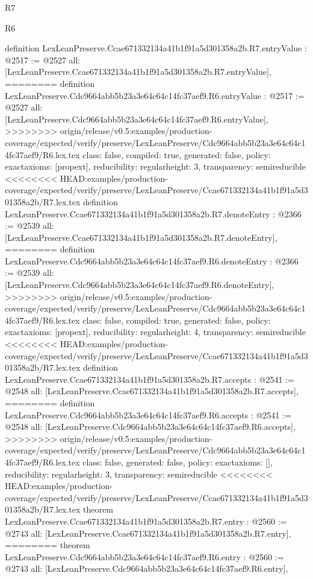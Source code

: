 \begin{lexlean}{R7}
\begin{lexlean}{R6}
\begin{coremodule}
{{{{{{{{{{{{{{definition LexLeanPreserve.Ccae671332134a41b1f91a5d301358a2b.R7.entryValue : @2517 := @2527 {
  all: [LexLeanPreserve.Ccae671332134a41b1f91a5d301358a2b.R7.entryValue],
========
definition LexLeanPreserve.Cdc9664abb5b23a3e64c64c14fc37aef9.R6.entryValue : @2517 := @2527 {
  all: [LexLeanPreserve.Cdc9664abb5b23a3e64c64c14fc37aef9.R6.entryValue],
>>>>>>>> origin/release/v0.5:examples/production-coverage/expected/verify/preserve/LexLeanPreserve/Cdc9664abb5b23a3e64c64c14fc37aef9/R6.lex.tex
  class: false,
  compiled: true,
  generated: false,
  policy: exact{axioms: [propext]},
  reducibility: regular{height: 3},
  transparency: semireducible
}
<<<<<<<< HEAD:examples/production-coverage/expected/verify/preserve/LexLeanPreserve/Ccae671332134a41b1f91a5d301358a2b/R7.lex.tex
definition LexLeanPreserve.Ccae671332134a41b1f91a5d301358a2b.R7.denoteEntry : @2366 := @2539 {
  all: [LexLeanPreserve.Ccae671332134a41b1f91a5d301358a2b.R7.denoteEntry],
========
definition LexLeanPreserve.Cdc9664abb5b23a3e64c64c14fc37aef9.R6.denoteEntry : @2366 := @2539 {
  all: [LexLeanPreserve.Cdc9664abb5b23a3e64c64c14fc37aef9.R6.denoteEntry],
>>>>>>>> origin/release/v0.5:examples/production-coverage/expected/verify/preserve/LexLeanPreserve/Cdc9664abb5b23a3e64c64c14fc37aef9/R6.lex.tex
  class: false,
  compiled: true,
  generated: false,
  policy: exact{axioms: [propext]},
  reducibility: regular{height: 4},
  transparency: semireducible
}
<<<<<<<< HEAD:examples/production-coverage/expected/verify/preserve/LexLeanPreserve/Ccae671332134a41b1f91a5d301358a2b/R7.lex.tex
definition LexLeanPreserve.Ccae671332134a41b1f91a5d301358a2b.R7.accepts : @2541 := @2548 {
  all: [LexLeanPreserve.Ccae671332134a41b1f91a5d301358a2b.R7.accepts],
========
definition LexLeanPreserve.Cdc9664abb5b23a3e64c64c14fc37aef9.R6.accepts : @2541 := @2548 {
  all: [LexLeanPreserve.Cdc9664abb5b23a3e64c64c14fc37aef9.R6.accepts],
>>>>>>>> origin/release/v0.5:examples/production-coverage/expected/verify/preserve/LexLeanPreserve/Cdc9664abb5b23a3e64c64c14fc37aef9/R6.lex.tex
  class: false,
  generated: false,
  policy: exact{axioms: []},
  reducibility: regular{height: 3},
  transparency: semireducible
}
<<<<<<<< HEAD:examples/production-coverage/expected/verify/preserve/LexLeanPreserve/Ccae671332134a41b1f91a5d301358a2b/R7.lex.tex
theorem LexLeanPreserve.Ccae671332134a41b1f91a5d301358a2b.R7.entry : @2560 := @2743 {
  all: [LexLeanPreserve.Ccae671332134a41b1f91a5d301358a2b.R7.entry],
========
theorem LexLeanPreserve.Cdc9664abb5b23a3e64c64c14fc37aef9.R6.entry : @2560 := @2743 {
  all: [LexLeanPreserve.Cdc9664abb5b23a3e64c64c14fc37aef9.R6.entry],
}}}}}}}}}}}}}}}}}}}
\end{coremodule}
\end{lexlean}
\end{lexlean}
